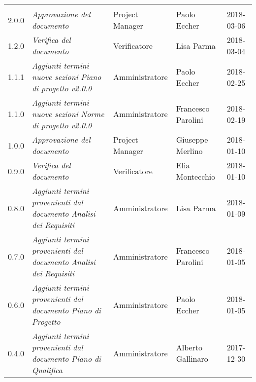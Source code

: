 \newpage 
\section*{}
\begin{table}[H]
	\centering
	\begin{tabular}{C{2cm}|C{4cm}|C{3cm}|C{3cm}|R{2cm}}
		
		  &  & &  & \\
		
		
		2.0.0 & \emph{Approvazione del documento} & Project Manager & Paolo Eccher & 2018-03-06  \\
		\hline
		
		1.2.0 & \emph{Verifica del documento} & Verificatore & Lisa Parma & 2018-03-04  \\
		\hline
		
		1.1.1 & \emph{Aggiunti termini nuove sezioni Piano di progetto v2.0.0} & Amministratore & Paolo Eccher & 2018-02-25  \\
		\hline
		
		1.1.0 & \emph{Aggiunti termini nuove sezioni Norme di progetto v2.0.0} & Amministratore & Francesco Parolini & 2018-02-19  \\
		\hline
		
		1.0.0 & \emph{Approvazione del documento} & Project Manager & Giuseppe Merlino & 2018-01-10  \\
		\hline
		
		0.9.0 & \emph{Verifica del documento} & Verificatore & Elia Montecchio  & 2018-01-10 \\
		\hline
		
		0.8.0 & \emph{Aggiunti termini provenienti dal documento Analisi dei Requisiti} & Amministratore  & Lisa Parma & 2018-01-09 \\
		\hline
		
		0.7.0 & \emph{Aggiunti termini provenienti dal documento Analisi dei Requisiti} & Amministratore & Francesco Parolini & 2018-01-05 \\
		\hline
		
		0.6.0 & \emph{Aggiunti termini provenienti dal documento Piano di Progetto} & Amministratore & Paolo Eccher & 2018-01-05  \\
		\hline
		
		0.4.0 & \emph{Aggiunti termini provenienti dal documento Piano di Qualifica} & Amministratore & Alberto Gallinaro & 2017-12-30 \\
		\hline
		

\end{tabular}
\end{table}
